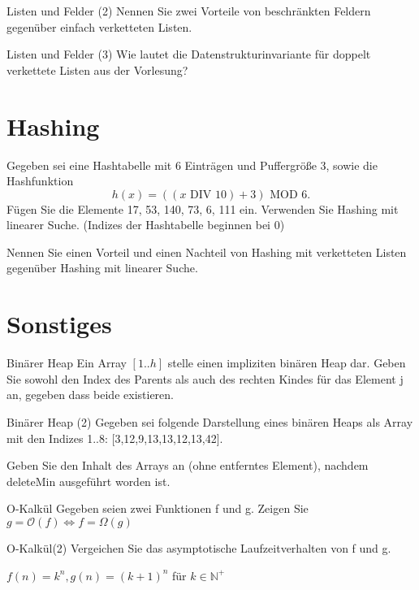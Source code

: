 \documentclass[18pt]{beamer}
\newcommand{\N}{\mathbb{N}}
\newcommand{\Oh}{\mathcal{O}}
\begin{document}
\begin{frame}{Listen und Felder (2)}
 Nennen Sie zwei Vorteile von beschränkten 
 Feldern gegenüber einfach verketteten Listen.
\end{frame}

\begin{frame}{Listen und Felder (3)}
 Wie lautet die Datenstrukturinvariante für doppelt verkettete Listen aus der Vorlesung?
\end{frame}

\section{Hashing}
\begin{frame}
 Gegeben sei eine Hashtabelle mit 6 Einträgen und Puffergröße 3, 
 sowie die Hashfunktion
$$h(x) = ((x \text{ DIV } 10) + 3) \text{ MOD } 6. $$
Fügen Sie die Elemente 17, 53, 140, 73, 6, 111 ein.
Verwenden Sie Hashing mit linearer Suche. 
(Indizes der Hashtabelle beginnen bei 0)
\end{frame}

\begin{frame}
 Nennen Sie einen Vorteil und einen Nachteil von 
 Hashing mit verketteten Listen gegenüber Hashing mit linearer Suche.
\end{frame}

\section{Sonstiges}
\begin{frame}{Binärer Heap}
 Ein Array $[1..h]$ stelle einen impliziten binären Heap dar. 
 Geben Sie sowohl den Index des Parents als auch des rechten 
 Kindes für das Element j an, gegeben dass beide existieren.
\end{frame}

\begin{frame}{Binärer Heap (2)}
 Gegeben sei folgende Darstellung eines binären Heaps 
 als Array mit den Indizes 1..8:
[3,12,9,13,13,12,13,42]. 

Geben Sie den Inhalt des Arrays an (ohne entferntes Element), nachdem 
deleteMin ausgeführt worden ist.
\end{frame}


\begin{frame}{O-Kalkül}
 Gegeben seien zwei Funktionen f und g.
 Zeigen Sie $g = \Oh(f) \iff f = \Omega(g)$
\end{frame}

\begin{frame}{O-Kalkül(2)}
 Vergeichen Sie das asymptotische Laufzeitverhalten von f und g.
 
 $f(n) = k^n, g(n) = (k+1)^n$
 für $k \in \N^+$
\end{frame}
\end{document}
